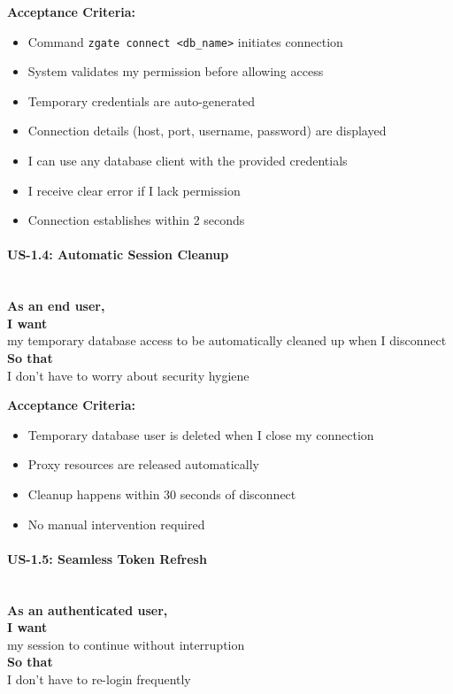 \noindent\textbf{Acceptance Criteria:}
\begin{itemize}
    \item Command \texttt{zgate connect <db\_name>} initiates connection
    \item System validates my permission before allowing access
    \item Temporary credentials are auto-generated
    \item Connection details (host, port, username, password) are displayed
    \item I can use any database client with the provided credentials
    \item I receive clear error if I lack permission
    \item Connection establishes within 2 seconds
\end{itemize}

\paragraph{US-1.4: Automatic Session Cleanup}
\mbox{}\\[0.5em]

\noindent\textbf{As an end user,} \\
\textbf{I want} \\
my temporary database access to be automatically cleaned up when I disconnect \\
\textbf{So that} \\
I don't have to worry about security hygiene

\noindent\textbf{Acceptance Criteria:}
\begin{itemize}
    \item Temporary database user is deleted when I close my connection
    \item Proxy resources are released automatically
    \item Cleanup happens within 30 seconds of disconnect
    \item No manual intervention required
\end{itemize}

\paragraph{US-1.5: Seamless Token Refresh}
\mbox{}\\[0.5em]

\noindent\textbf{As an authenticated user,} \\
\textbf{I want} \\
my session to continue without interruption \\
\textbf{So that} \\
I don't have to re-login frequently

